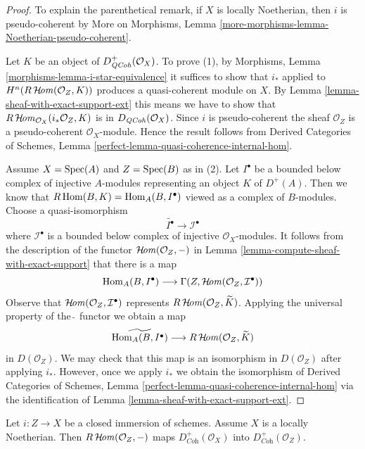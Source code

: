 \begin{proof}
To explain the parenthetical remark, if $X$ is locally Noetherian, then
$i$ is pseudo-coherent by
More on Morphisms, Lemma \ref{more-morphisms-lemma-Noetherian-pseudo-coherent}.

\medskip\noindent
Let $K$ be an object of $D^+_{\mathit{QCoh}}(\mathcal{O}_X)$. To prove (1), by
Morphisms, Lemma \ref{morphisms-lemma-i-star-equivalence}
it suffices to show that $i_*$ applied to
$H^n(R\mathop{\mathcal{H}\!\mathit{om}}\nolimits(\mathcal{O}_Z, K))$ produces a
quasi-coherent module on $X$. By
Lemma \ref{lemma-sheaf-with-exact-support-ext}
this means we have to show that
$R\mathop{\mathcal{H}\!\mathit{om}}\nolimits_{\mathcal{O}_X}(i_*\mathcal{O}_Z, K)$
is in $D_{\mathit{QCoh}}(\mathcal{O}_X)$. Since $i$ is pseudo-coherent
the sheaf $\mathcal{O}_Z$ is a pseudo-coherent $\mathcal{O}_X$-module.
Hence the result follows from
Derived Categories of Schemes, Lemma
\ref{perfect-lemma-quasi-coherence-internal-hom}.

\medskip\noindent
Assume $X = \mathop{\mathrm{Spec}}(A)$ and $Z = \mathop{\mathrm{Spec}}(B)$ as in (2).
Let $I^\bullet$ be a bounded below complex of injective $A$-modules
representing an object $K$ of $D^+(A)$.
Then we know that $R\mathop{\mathrm{Hom}}\nolimits(B, K) = \mathop{\mathrm{Hom}}\nolimits_A(B, I^\bullet)$ viewed
as a complex of $B$-modules. Choose a quasi-isomorphism
$$
\widetilde{I^\bullet} \longrightarrow \mathcal{I}^\bullet
$$
where $\mathcal{I}^\bullet$ is a bounded below complex of injective
$\mathcal{O}_X$-modules. It follows from the description of
the functor $\mathop{\mathcal{H}\!\mathit{om}}\nolimits(\mathcal{O}_Z, -)$ in
Lemma \ref{lemma-compute-sheaf-with-exact-support}
that there is a map
$$
\mathop{\mathrm{Hom}}\nolimits_A(B, I^\bullet)
\longrightarrow
\Gamma(Z, \mathop{\mathcal{H}\!\mathit{om}}\nolimits(\mathcal{O}_Z, \mathcal{I}^\bullet))
$$
Observe that $\mathop{\mathcal{H}\!\mathit{om}}\nolimits(\mathcal{O}_Z, \mathcal{I}^\bullet)$
represents $R\mathop{\mathcal{H}\!\mathit{om}}\nolimits(\mathcal{O}_Z, \widetilde{K})$.
Applying the universal property of the $\widetilde{\ }$ functor we
obtain a map
$$
\widetilde{\mathop{\mathrm{Hom}}\nolimits_A(B, I^\bullet)}
\longrightarrow
R\mathop{\mathcal{H}\!\mathit{om}}\nolimits(\mathcal{O}_Z, \widetilde{K})
$$
in $D(\mathcal{O}_Z)$. We may check that this map is an isomorphism in
$D(\mathcal{O}_Z)$ after applying $i_*$. However, once we apply
$i_*$ we obtain the isomorphism of Derived Categories of Schemes,
Lemma \ref{perfect-lemma-quasi-coherence-internal-hom}
via the identification of
Lemma \ref{lemma-sheaf-with-exact-support-ext}.
\end{proof}

\begin{lemma}
\label{lemma-sheaf-with-exact-support-coherent}
Let $i : Z \to X$ be a closed immersion of schemes.
Assume $X$ is a locally Noetherian.
Then $R\mathop{\mathcal{H}\!\mathit{om}}\nolimits(\mathcal{O}_Z, -)$ maps $D^+_{\textit{Coh}}(\mathcal{O}_X)$
into $D^+_{\textit{Coh}}(\mathcal{O}_Z)$.
\end{lemma}

